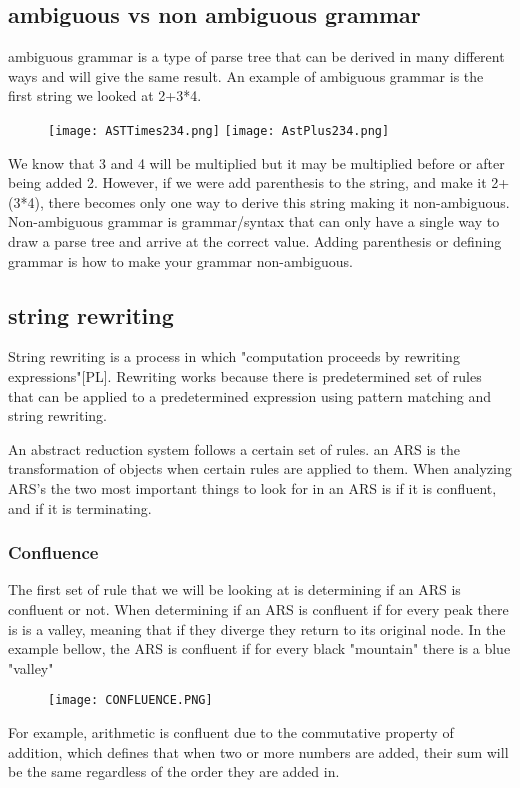 \documentclass{article}
\begin{document}
\subsection{ambiguous vs non ambiguous grammar}
ambiguous grammar is a type of parse tree that can be derived in many different ways and will give the same result. An example of ambiguous grammar is the first string we looked at  2+3*4.
\begin{figure}[H]
    \centering
    \texttt{[image: ASTTimes234.png]}
    \texttt{[image: AstPlus234.png]}
\end{figure}
We know that 3 and 4 will be multiplied but it may be multiplied before or after being added 2. However, if we were add parenthesis to the string, and make it 2+(3*4), there becomes only one way to derive this string making it non-ambiguous. Non-ambiguous grammar is grammar/syntax that can only have a single way to draw a parse tree and arrive at the correct value. Adding parenthesis or defining grammar is how to make your grammar non-ambiguous.


\subsection{string rewriting}
String rewriting is a process in which "computation proceeds by rewriting expressions"[PL]. Rewriting works because there is predetermined set of rules that can be applied to a predetermined expression using pattern matching and string rewriting.

An abstract reduction system follows a certain set of rules. an ARS is the transformation of objects when certain rules are applied to them. When analyzing ARS's the two most important things to look for in an ARS is if it is confluent, and if it is terminating.

\subsubsection{Confluence}

The first set of rule that we will be looking at is determining if an ARS is confluent or not. When determining if an ARS is confluent if for every peak there is is a valley, meaning that if they diverge they return to its original node. In the example bellow, the ARS is confluent if for every black "mountain" there is a blue "valley"

\begin{figure}[H]
    \centering
    \texttt{[image: CONFLUENCE.PNG]}

\end{figure}
For example, arithmetic is confluent due to the commutative property of addition, which defines that when two or more numbers are added, their sum will be the same regardless of the order they are added in.
\end{document}
